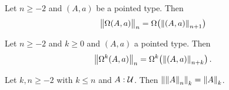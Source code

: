 \documentclass[hott-all.tex]{subfiles}
\begin{document}
% 
\begin{cor}
  Let $n\ge-2$ and $(A,a)$ be a pointed type. Then
  \[\ttrunc n{\Omega(A,a)}=\Omega\mathopen{}\left(\trunc{n+1}{(A,a)}\right)\]
\end{cor}
% 
\begin{cor}
  Let $n\ge -2$ and $k\ge 0$ and $(A,a)$ a pointed type.  Then
  \[\ttrunc n{\Omega^k(A,a)} = \Omega^k\mathopen{}\left(\trunc{n+k}{(A,a)}\right). \]
\end{cor}
% 
% 
\begin{lem} 
  Let $k,n\ge-2$ with $k\le{}n$ and $A:\type$. Then
  $\trunc k{\trunc nA}=\trunc kA$.
\end{lem}
% 
% 
% 
% 
\end{document}
